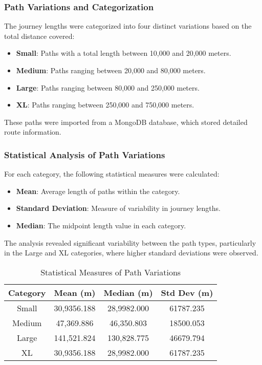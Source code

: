 \documentclass[sigplan,screen]{acmart}
\begin{document}
\subsubsection{Path Variations and Categorization}
The journey lengths were categorized into four distinct variations based on the total distance covered:
\begin{itemize}
    \item \textbf{Small}: Paths with a total length between 10,000 and 20,000 meters.
    \item \textbf{Medium}: Paths ranging between 20,000 and 80,000 meters.
    \item \textbf{Large}: Paths ranging between 80,000 and 250,000 meters.
    \item \textbf{XL}: Paths ranging between 250,000 and 750,000 meters.
\end{itemize}
These paths were imported from a MongoDB database, which stored detailed route information.

\subsubsection{Statistical Analysis of Path Variations}
For each category, the following statistical measures were calculated:
\begin{itemize}
    \item \textbf{Mean}: Average length of paths within the category.
    \item \textbf{Standard Deviation}: Measure of variability in journey lengths.
    \item \textbf{Median}: The midpoint length value in each category.
\end{itemize}
The analysis revealed significant variability between the path types, particularly in the Large and XL categories, where higher standard deviations were observed.

\begin{table}[h!]
\centering
\begin{tabular}{|c|c|c|c|}
\hline
\textbf{Category} & \textbf{Mean (m)} & \textbf{Median (m)} & \textbf{Std Dev (m)} \\
\hline
Small & 30,9356.188 & 28,9982.000 & 61787.235 \\
Medium & 47,369.886 & 46,350.803 & 18500.053 \\
Large & 141,521.824 & 130,828.775 & 46679.794 \\
XL & 30,9356.188 & 28,9982.000 & 61787.235 \\
\hline
\end{tabular}
\caption{Statistical Measures of Path Variations}
\end{table}
\end{document}
